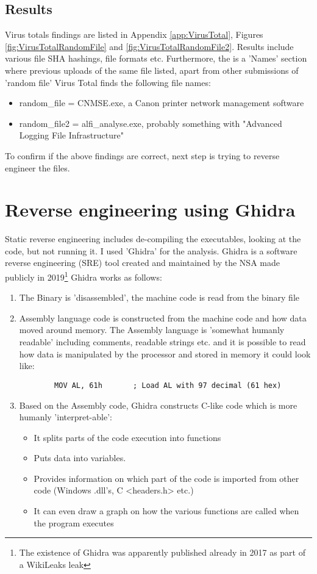 \documentclass[
	letterpaper, %
	10pt, %
	unnumberedsections, %
	twoside, %
]{APAAssignment}
\begin{document}
\subsection{Results} Virus totals findings are listed in Appendix \ref{app:VirusTotal}, Figures \ref{fig:VirusTotalRandomFile} and \ref{fig:VirusTotalRandomFile2}. Results include various file SHA hashings, file formats etc. Furthermore, the is a 'Names' section where previous uploads of the same file listed, apart from other submissions of 'random file' Virus Total finds the following file names:

\begin{itemize}
	\item random\_file = CNMSE.exe, a Canon printer network management software
	\item random\_file2 = alfi\_analyse.exe, probably something with "Advanced Logging File Infrastructure"
\end{itemize}

To confirm if the above findings are correct, next step is trying to reverse engineer the files.

\section{Reverse engineering using Ghidra}
Static reverse engineering includes de-compiling the executables, looking at the code, but not running it. I used 'Ghidra'\cite{Ghidra} for the analysis. 
Ghidra is a software reverse engineering (SRE) tool created and maintained by the NSA\cite{GhidraGithub} made publicly in 2019\footnote{The existence of Ghidra was apparently published already in 2017 as part of a WikiLeaks leak\cite{Vault7leak}} 
Ghidra works as follows:

\begin{enumerate}
	\item The Binary is 'disassembled', the machine code is read from the binary file
	\item Assembly language code is constructed from the machine code and how data moved around memory. The Assembly language is 'somewhat humanly readable' including comments, readable strings etc. and it is possible to read how data is manipulated by the processor and stored in memory it could look like:  
	\begin{verbatim}
		MOV AL, 61h       ; Load AL with 97 decimal (61 hex)
	\end{verbatim} 
	
	\item Based on the Assembly code, Ghidra constructs C-like code which is more humanly 'interpret-able': \begin{itemize}
		\item It splits parts of the code execution into functions
		\item Puts data into variables.
		\item Provides information on which part of the code is imported from other code (Windows .dll's, C <headers.h> etc.)    
		\item It can even draw a graph on how the various functions are called when the program executes
	\end{itemize}
\end{enumerate}
\end{document}
